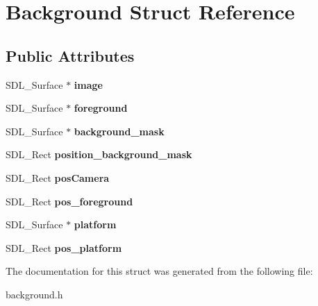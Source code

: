 \hypertarget{structBackground}{}\section{Background Struct Reference}
\label{structBackground}
\subsection*{Public Attributes}
\begin{DoxyCompactItemize}
\item 
\mbox{\label{structBackground_a637e6c83f05e045ce23bda645cdd8574}} 
S\+D\+L\+\_\+\+Surface $\ast$ {\bfseries image}
\item 
\mbox{\label{structBackground_a3d66779716725a2f8377aaed0eb374b2}} 
S\+D\+L\+\_\+\+Surface $\ast$ {\bfseries foreground}
\item 
\mbox{\label{structBackground_ac76c2da4307e469688a1286d4ac70842}} 
S\+D\+L\+\_\+\+Surface $\ast$ {\bfseries background\+\_\+mask}
\item 
\mbox{\label{structBackground_a6a43437543c71a78285c8049b5cb3dc0}} 
S\+D\+L\+\_\+\+Rect {\bfseries position\+\_\+background\+\_\+mask}
\item 
\mbox{\label{structBackground_a41d570eb769454b0488aeccd9e4970a2}} 
S\+D\+L\+\_\+\+Rect {\bfseries pos\+Camera}
\item 
\mbox{\label{structBackground_afa1e935c412a4c4154f5c3e2b7b93791}} 
S\+D\+L\+\_\+\+Rect {\bfseries pos\+\_\+foreground}
\item 
\mbox{\label{structBackground_a57b869b301c9c1e8f69c9abee7e00b2a}} 
S\+D\+L\+\_\+\+Surface $\ast$ {\bfseries platform}
\item 
\mbox{\label{structBackground_af35046bf47fc0b707d62020227b58720}} 
S\+D\+L\+\_\+\+Rect {\bfseries pos\+\_\+platform}
\end{DoxyCompactItemize}


The documentation for this struct was generated from the following file\+:\begin{DoxyCompactItemize}
\item 
background.\+h\end{DoxyCompactItemize}
